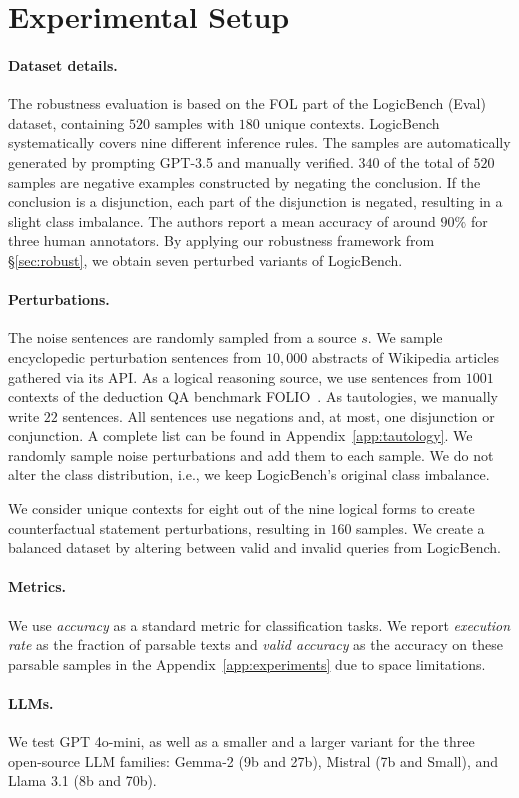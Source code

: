 \section{Experimental Setup}
\paragraph{Dataset details.}
The robustness evaluation is based on the \ac{FOL} part of the LogicBench (Eval)~\cite{mihir_parmar_logicbench_2023} dataset, containing $520$ samples with $180$ unique contexts. LogicBench systematically covers nine different inference rules. The samples are automatically generated by prompting GPT-3.5 and manually verified. $340$ of the total of $520$ samples are negative examples constructed by negating the conclusion. If the conclusion is a disjunction, each part of the disjunction is negated, resulting in a slight class imbalance. The authors report a mean accuracy of around $90\%$ for three human annotators. By applying our robustness framework from §\ref{sec:robust}, we obtain seven perturbed variants of LogicBench.

\paragraph{Perturbations.}
The noise sentences are randomly sampled from a source $s$. We sample encyclopedic perturbation sentences from $10,000$ abstracts of Wikipedia articles gathered via its API.
As a logical reasoning source, we use sentences from $1001$ contexts of the deduction \ac{QA} benchmark FOLIO~\cite{han_folio_2022}. 
As tautologies, we manually write $22$ sentences. All sentences use negations and, at most, one disjunction or conjunction. A complete list can be found in  Appendix~\ref{app:tautology}.
We randomly sample noise perturbations and add them to each sample. We do not alter the class distribution, i.e., we keep LogicBench's original class imbalance.

We consider unique contexts for eight out of the nine logical forms to create counterfactual statement perturbations, resulting in $160$ samples. We create a balanced dataset by altering between valid and invalid queries from LogicBench. 

\paragraph{Metrics.} We use \emph{accuracy} as a standard metric for classification tasks. We report \emph{execution rate} as the fraction of parsable texts and \emph{valid accuracy} as the accuracy on these parsable samples in the Appendix~\ref{app:experiments} due to space limitations. 

\paragraph{LLMs.} 
We test GPT 4o-mini, as well as a smaller and a larger variant for the three open-source \ac{LLM} families: Gemma-2 (9b and 27b), Mistral (7b and Small), and Llama 3.1 (8b and 70b).